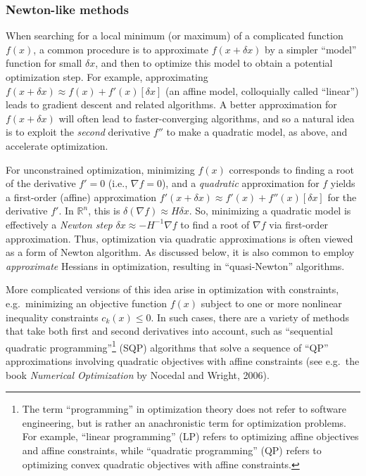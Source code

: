\subsubsection{Newton-like methods}

When searching for a local minimum (or maximum) of a complicated function $f(x)$, a common procedure is to approximate $f(x+\delta x)$ by a simpler ``model'' function for small $\delta x$, and then to optimize this model to obtain a potential optimization step.   For example, approximating $f(x+\delta x) \approx f(x)+f'(x)[\delta x]$ (an affine model, colloquially called ``linear'') leads to gradient descent and related algorithms.  A better approximation for $f(x + \delta x)$ will often lead to faster-converging algorithms, and so a natural idea is to exploit the \emph{second} derivative $f''$ to make a quadratic model, as above, and accelerate optimization.

For unconstrained optimization, minimizing $f(x)$ corresponds to finding a root of the derivative $f' = 0$ (i.e., $\nabla f = 0$), and a \emph{quadratic} approximation for $f$ yields a first-order (affine) approximation $f'(x + \delta x) \approx f'(x) + f''(x)[\delta x]$ for the derivative $f'$. In $\mathbb{R}^n$, this is $\delta(\nabla f) \approx H \delta x$.  So, minimizing a quadratic model is effectively a \emph{Newton step} $\delta x \approx -H^{-1} \nabla f$ to find a root of $\nabla f$ via first-order approximation.   Thus, optimization via quadratic approximations is often viewed as a form of Newton algorithm.  As discussed below, it is also common to employ \emph{approximate} Hessians in optimization, resulting in ``quasi-Newton'' algorithms.

More complicated versions of this idea arise in optimization with constraints, e.g.~minimizing an objective function $f(x)$ subject to one or more nonlinear inequality constraints $c_k(x) \le 0$.   In such cases, there are a variety of methods that take both first and second derivatives into account, such as ``sequential quadratic programming''\footnote{The term ``programming'' in optimization theory does not refer to software engineering, but is rather an anachronistic term for optimization problems.  For example, ``linear programming'' (LP) refers to optimizing affine objectives and affine constraints, while ``quadratic programming'' (QP) refers to optimizing convex quadratic objectives with affine constraints.} (SQP) algorithms that solve a sequence of ``QP'' approximations involving quadratic objectives with affine constraints (see e.g.~the book \textit{Numerical Optimization} by Nocedal and Wright, 2006).

